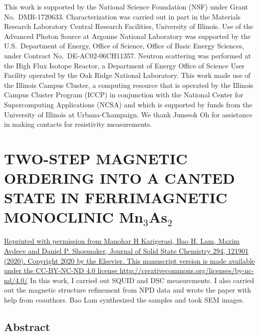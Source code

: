\documentclass[10pt,doublespacing,edeposit]{uiucthesis2020}
\begin{document}
\begin{mainmatter}
This work is supported by the National Science Foundation (NSF) under Grant No.\ DMR-1720633.
Characterization was carried out in part in the Materials Research Laboratory Central Research Facilities, University of Illinois. Use of the Advanced Photon Source at Argonne National Laboratory was supported by the U.S.\ Department of Energy, Office of Science, Office of Basic Energy Sciences, under Contract No.\ DE-AC02-06CH11357. Neutron scattering was performed at the High Flux Isotope Reactor, a Department of Energy Office of Science User Facility operated by the Oak Ridge National Laboratory.
This work made use of the Illinois Campus Cluster, a computing resource that is operated by the Illinois Campus Cluster Program (ICCP) in conjunction with the National Center for Supercomputing Applications (NCSA) and which is supported by funds from the University of Illinois at Urbana-Champaign.
We thank Junseok Oh for assistance in making contacts for resistivity measurements.

\chapter{TWO-STEP MAGNETIC ORDERING INTO A CANTED STATE IN FERRIMAGNETIC MONOCLINIC Mn$_3$As$_2$}


\vspace{20mm}

\href{https://doi.org/10.1016/j.jssc.2020.121901}{Reprinted with permission from Manohar H Karigerasi, Bao H. Lam, Maxim Avdeev and Daniel P. Shoemaker, Journal of Solid State Chemistry 294, 121901 (2020). Copyright 2020 by the Elsevier. This manuscript version is made available under the CC-BY-NC-ND 4.0 license http://creativecommons.org/licenses/by-nc-nd/4.0/} In this work, I carried out SQUID and DSC measurements. I also carried out the magnetic structure refinement from NPD data and wrote the paper with help from coauthors. Bao Lam synthesized the samples and took SEM images.


\section{Abstract}


\end{mainmatter}
\end{document}
